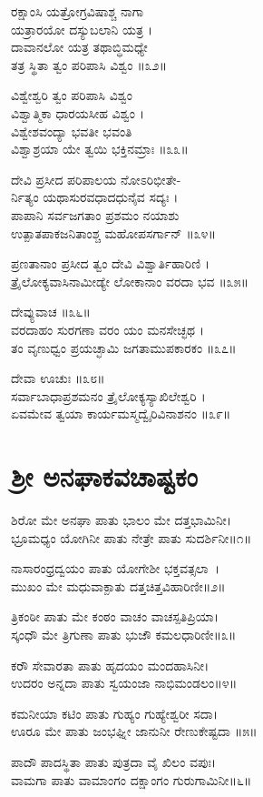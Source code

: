 ರಕ್ಷಾಂಸಿ ಯತ್ರೋಗ್ರವಿಷಾಶ್ಚ ನಾಗಾ\\
        ಯತ್ರಾರಯೋ ದಸ್ಯುಬಲಾನಿ ಯತ್ರ ।\\
ದಾವಾನಲೋ ಯತ್ರ ತಥಾಬ್ಧಿಮಧ್ಯೇ\\
        ತತ್ರ ಸ್ಥಿತಾ ತ್ವಂ ಪರಿಪಾಸಿ ವಿಶ್ವಂ ॥೩೨॥

ವಿಶ್ವೇಶ್ವರಿ ತ್ವಂ ಪರಿಪಾಸಿ ವಿಶ್ವಂ\\
        ವಿಶ್ವಾತ್ಮಿಕಾ ಧಾರಯಸೀಹ ವಿಶ್ವಂ ।\\
ವಿಶ್ವೇಶವಂದ್ಯಾ ಭವತೀ ಭವಂತಿ\\
        ವಿಶ್ವಾಶ್ರಯಾ ಯೇ ತ್ವಯಿ ಭಕ್ತಿನಮ್ರಾಃ ॥೩೩॥

ದೇವಿ ಪ್ರಸೀದ ಪರಿಪಾಲಯ ನೋಽರಿಭೀತೇ-\\
      ರ್ನಿತ್ಯಂ ಯಥಾಸುರವಧಾದಧುನೈವ ಸದ್ಯಃ ।\\
ಪಾಪಾನಿ ಸರ್ವಜಗತಾಂ ಪ್ರಶಮಂ ನಯಾಶು\\
        ಉತ್ಪಾತಪಾಕಜನಿತಾಂಶ್ಚ ಮಹೋಪಸರ್ಗಾನ್ ॥೩೪॥

ಪ್ರಣತಾನಾಂ ಪ್ರಸೀದ ತ್ವಂ ದೇವಿ ವಿಶ್ವಾರ್ತಿಹಾರಿಣಿ ।\\
ತ್ರೈಲೋಕ್ಯವಾಸಿನಾಮೀಡ್ಯೇ ಲೋಕಾನಾಂ ವರದಾ ಭವ ॥೩೫॥

ದೇವ್ಯುವಾಚ ॥೩೬॥\\
ವರದಾಹಂ ಸುರಗಣಾ ವರಂ ಯಂ ಮನಸೇಚ್ಛಥ ।\\
ತಂ ವೃಣುಧ್ವಂ ಪ್ರಯಚ್ಛಾಮಿ ಜಗತಾಮುಪಕಾರಕಂ ॥೩೭॥

ದೇವಾ ಊಚುಃ ॥೩೮॥\\
ಸರ್ವಾಬಾಧಾಪ್ರಶಮನಂ ತ್ರೈಲೋಕ್ಯಸ್ಯಾಖಿಲೇಶ್ವರಿ ।\\
ಏವಮೇವ ತ್ವಯಾ ಕಾರ್ಯಮಸ್ಮದ್ವೈರಿವಿನಾಶನಂ ॥೩೯॥
\section{ ಶ್ರೀ ಅನಘಾಕವಚಾಷ್ಟಕಂ }
ಶಿರೋ ಮೇ ಅನಘಾ ಪಾತು ಭಾಲಂ ಮೇ ದತ್ತಭಾಮಿನೀ।\\
ಭ್ರೂಮಧ್ಯಂ ಯೋಗಿನೀ ಪಾತು ನೇತ್ರೇ ಪಾತು ಸುದರ್ಶಿನೀ॥೧॥

ನಾಸಾರಂಧ್ರದ್ವಯಂ ಪಾತು ಯೋಗೇಶೀ ಭಕ್ತವತ್ಸಲಾ~।\\
ಮುಖಂ ಮೇ ಮಧುವಾಕ್ಪಾತು ದತ್ತಚಿತ್ತವಿಹಾರಿಣೀ॥೨॥

ತ್ರಿಕಂಠೀ ಪಾತು ಮೇ ಕಂಠಂ ವಾಚಂ ವಾಚಸ್ಪತಿಪ್ರಿಯಾ।\\
ಸ್ಕಂಧೌ ಮೇ ತ್ರಿಗುಣಾ ಪಾತು ಭುಜೌ ಕಮಲಧಾರಿಣೀ॥೩॥

ಕರೌ ಸೇವಾರತಾ ಪಾತು ಹೃದಯಂ ಮಂದಹಾಸಿನೀ।\\
ಉದರಂ ಅನ್ನದಾ ಪಾತು ಸ್ವಯಂಜಾ ನಾಭಿಮಂಡಲಂ॥೪॥

ಕಮನೀಯಾ ಕಟಿಂ ಪಾತು ಗುಹ್ಯಂ ಗುಹ್ಯೇಶ್ವರೀ ಸದಾ।\\
ಊರೂ ಮೇ ಪಾತು ಜಂಭಘ್ನೀ ಜಾನುನೀ ರೇಣುಕೇಷ್ಟದಾ ॥೫॥

ಪಾದೌ ಪಾದಸ್ಥಿತಾ ಪಾತು ಪುತ್ರದಾ ವೈ ಖಿಲಂ ವಪುಃ।\\
ವಾಮಗಾ ಪಾತು ವಾಮಾಂಗಂ ದಕ್ಷಾಂಗಂ ಗುರುಗಾಮಿನೀ॥೬॥

